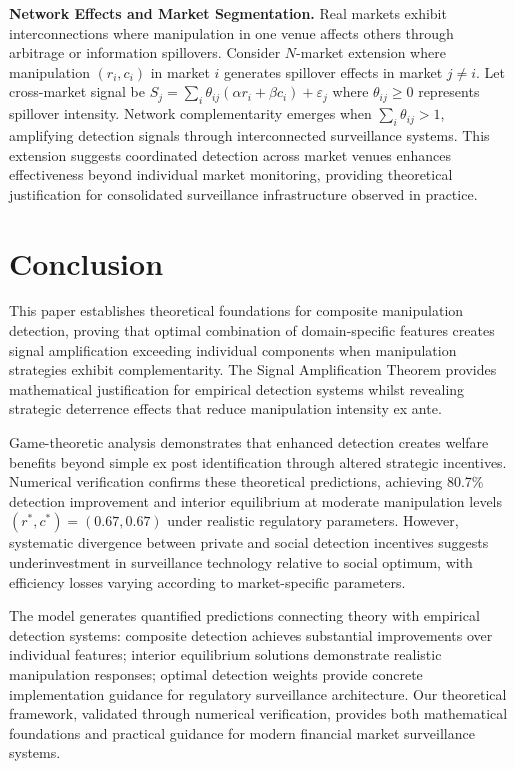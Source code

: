 \documentclass[12pt]{article}
\begin{document}
\textbf{Network Effects and Market Segmentation.} Real markets exhibit interconnections where manipulation in one venue affects others through arbitrage or information spillovers. Consider $N$-market extension where manipulation $(r_i, c_i)$ in market $i$ generates spillover effects in market $j \neq i$. Let cross-market signal be $S_j = \sum_{i} \theta_{ij}(\alpha r_i + \beta c_i) + \varepsilon_j$ where $\theta_{ij} \geq 0$ represents spillover intensity. Network complementarity emerges when $\sum_i \theta_{ij} > 1$, amplifying detection signals through interconnected surveillance systems. This extension suggests coordinated detection across market venues enhances effectiveness beyond individual market monitoring, providing theoretical justification for consolidated surveillance infrastructure observed in practice.

\section{Conclusion}

This paper establishes theoretical foundations for composite manipulation detection, proving that optimal combination of domain-specific features creates signal amplification exceeding individual components when manipulation strategies exhibit complementarity. The Signal Amplification Theorem provides mathematical justification for empirical detection systems whilst revealing strategic deterrence effects that reduce manipulation intensity ex ante.

Game-theoretic analysis demonstrates that enhanced detection creates welfare benefits beyond simple ex post identification through altered strategic incentives. Numerical verification confirms these theoretical predictions, achieving 80.7\% detection improvement and interior equilibrium at moderate manipulation levels $(r^*, c^*) = (0.67, 0.67)$ under realistic regulatory parameters. However, systematic divergence between private and social detection incentives suggests underinvestment in surveillance technology relative to social optimum, with efficiency losses varying according to market-specific parameters.

The model generates quantified predictions connecting theory with empirical detection systems: composite detection achieves substantial improvements over individual features; interior equilibrium solutions demonstrate realistic manipulation responses; optimal detection weights provide concrete implementation guidance for regulatory surveillance architecture. Our theoretical framework, validated through numerical verification, provides both mathematical foundations and practical guidance for modern financial market surveillance systems.
\end{document}
